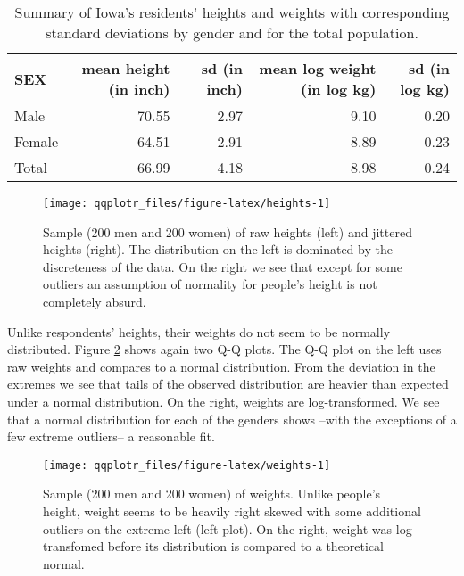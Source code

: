 \begin{table}

\caption{\label{tab:heights-table}Summary of Iowa's residents' heights and weights with corresponding standard deviations by gender and for the total population.\label{tab:heights}}
\centering
\begin{tabular}[t]{lrrrr}
\toprule
SEX & mean height (in inch) & sd (in inch) & mean log weight (in log kg) & sd (in log kg)\\
\midrule
Male & 70.55 & 2.97 & 9.10 & 0.20\\
Female & 64.51 & 2.91 & 8.89 & 0.23\\
Total & 66.99 & 4.18 & 8.98 & 0.24\\
\bottomrule
\end{tabular}
\end{table}

\begin{Schunk}
\begin{figure}

{\centering \texttt{[image: qqplotr\_files/figure-latex/heights-1]} 

}

\caption[Sample (200 men and 200 women) of raw heights (left) and jittered heights (right)]{Sample (200 men and 200 women) of raw heights (left) and jittered heights (right). The distribution on the left is dominated by the discreteness of the data. On the right we see that except for some outliers an assumption of normality for people's height is not completely absurd.}\label{fig:heights}
\end{figure}
\end{Schunk}

Unlike respondents' heights, their weights do not seem to be normally
distributed. Figure \ref{fig:weights} shows again two Q-Q plots. The Q-Q
plot on the left uses raw weights and compares to a normal distribution.
From the deviation in the extremes we see that tails of the observed
distribution are heavier than expected under a normal distribution. On
the right, weights are log-transformed. We see that a normal
distribution for each of the genders shows --with the exceptions of a
few extreme outliers-- a reasonable fit.

\begin{Schunk}
\begin{figure}

{\centering \texttt{[image: qqplotr\_files/figure-latex/weights-1]} 

}

\caption[Sample (200 men and 200 women) of weights]{Sample (200 men and 200 women) of weights. Unlike people's height, weight seems to be heavily right skewed with some additional outliers on the extreme left (left plot). On the right, weight was log-transfomed before its distribution is compared to a theoretical normal. }\label{fig:weights}
\end{figure}
\end{Schunk}

